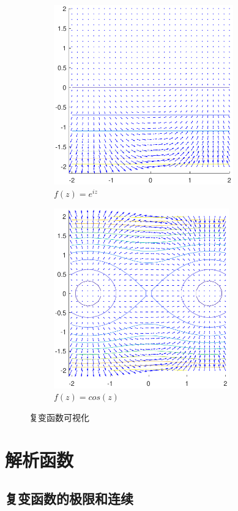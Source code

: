 \documentclass[UTF8]{report}
\theoremstyle{MyLineTheoremStyle} %
\theoremstyle{MyBlockTheoremStyle} %
\theoremstyle{MySubsubsectionStyle} %
\begin{document}
\begin{figure}[H]\centering
    \begin{subfigure}[t]{0.49\textwidth}\centering
        \includegraphics[height=220pt]{assets/1,2/e^(iz).pdf}
        \caption{ $f(z) = e^{iz}$ }
    \end{subfigure}\begin{subfigure}[t]{0.49\textwidth}\centering
        \includegraphics[height=220pt]{assets/1,2/cos(iz).pdf}
        \caption{ $f(z) = cos(z)$ }
    \end{subfigure}
    \caption{ 复变函数可视化 }\label{可视化2}
\end{figure}

\chapter{解析函数}\thispagestyle{fancy}

\section{复变函数的极限和连续}
\end{document}
